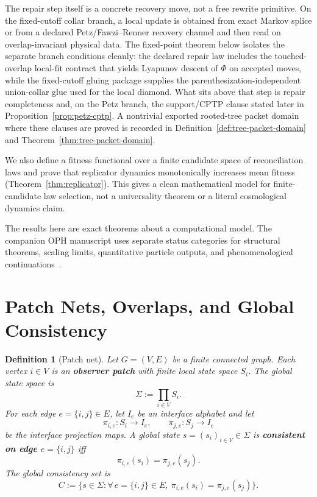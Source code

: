 \documentclass[11pt]{article}
\newtheorem{definition}[theorem]{Definition}
\theoremstyle{remark}
\theoremstyle{plain}
\begin{document}
The repair step itself is a concrete recovery move, not a free rewrite primitive. On the
fixed-cutoff collar branch, a local update is obtained from exact Markov splice or from a
declared Petz/Fawzi--Renner recovery channel and then read on overlap-invariant physical data.
The fixed-point theorem below isolates the separate branch conditions cleanly: the declared
repair law includes the touched-overlap local-fit contract that yields Lyapunov descent of
\(\Phi\) on accepted moves, while the fixed-cutoff gluing package supplies the
parenthesization-independent union-collar glue used for the local diamond. What sits above
that step is repair completeness and, on the Petz branch, the support/CPTP clause stated later in
Proposition~\ref{prop:petz-cptp}.
A nontrivial exported rooted-tree packet domain where these clauses are proved is recorded in
Definition~\ref{def:tree-packet-domain} and Theorem~\ref{thm:tree-packet-domain}.

We also define a fitness functional over a finite candidate space of reconciliation laws and prove
that replicator dynamics monotonically increases mean fitness (Theorem~\ref{thm:replicator}). This
gives a clean mathematical model for finite-candidate law selection, not a universality theorem or
a literal cosmological dynamics claim.

The results here are exact theorems about a computational model. The companion
OPH manuscript uses separate status categories for structural theorems, scaling
limits, quantitative particle outputs, and phenomenological
continuations~\cite{OPH}.


\section{Patch Nets, Overlaps, and Global Consistency}

\begin{definition}[Patch net]\label{def:patchnet}
Let $G=(V,E)$ be a finite connected graph. Each vertex $i\in V$ is an \textbf{observer patch} with finite local state space $S_i$. The global state space is
\[
\Sigma := \prod_{i\in V} S_i.
\]
For each edge $e=\{i,j\}\in E$, let $I_e$ be an interface alphabet and let
\[
\pi_{i,e}:S_i\to I_e,
\qquad
\pi_{j,e}:S_j\to I_e
\]
be the interface projection maps. A global state $s=(s_i)_{i\in V}\in\Sigma$ is \textbf{consistent on edge $e=\{i,j\}$} iff
\[
\pi_{i,e}(s_i)=\pi_{j,e}(s_j).
\]
The global consistency set is
\[
C:=\bigl\{s\in\Sigma:\forall\, e=\{i,j\}\in E,\ \pi_{i,e}(s_i)=\pi_{j,e}(s_j)\bigr\}.
\]
\end{definition}
\end{document}
